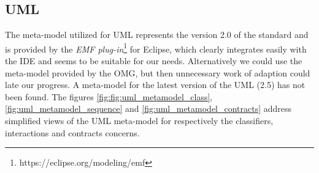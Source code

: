 \documentclass[tuberlin,cic,tc,english,noabntcite]{iiufrgs}
\begin{document}
\subsection{UML}
The meta-model utilized for UML represents the version 2.0 of the standard and is provided by the \emph{EMF plug-in}\footnote{https://eclipse.org/modeling/emf} for Eclipse, which clearly integrates easily with the IDE and seems to be suitable for our needs. Alternatively we could use the meta-model provided by the OMG, but then unnecessary work of adaption could late our progress. A meta-model for the latest version of the UML (2.5) has not been found. The figures \ref{fig:fig:uml_metamodel_class}, \ref{fig:uml_metamodel_sequence} and \ref{fig:uml_metamodel_contracts} address simplified views of the UML meta-model for respectively the classifiers, interactions and contracts concerns.
\end{document}
